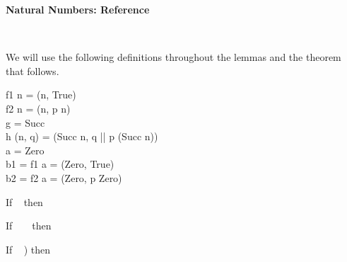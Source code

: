 \documentclass{seminar}
\begin{document}
\begin{slide}

\begin{center}
\begin{LARGE}
\textbf{Natural Numbers:  Reference}
\end{LARGE}\\[3ex]
\end{center}

We will use the following definitions throughout the lemmas and
the theorem that follows.

\begin{code}
f1 n     = (n, True)\\
f2 n     = (n, p n)\\
g        = Succ\\
h (n, q) = (Succ n, q || p (Succ n))\\
a        = Zero\\
b1       = f1 a = (Zero, True)\\
b2       = f2 a = (Zero, p Zero)
\end{code}


\newpage

\begin{lemma} \label{lemma-a}
\end{lemma}

\vspace{0.2in}

\begin{lemma} \label{lemma-b}
If ~ 
\newline
then ~ 
\end{lemma}

\vspace{0.2in}

\begin{lemma} \label{lemma-e}
\end{lemma}

\vspace{0.2in}


\begin{lemma}
\end{lemma}

\vspace{0.2in}

\begin{lemma} \label{lemma-f}
If ~  ~
then ~
\end{lemma}

\vspace{0.2in}

\begin{lemma} \label{lemma-c}
If ~  ) \tm{\wedge}
\newline
then ~ 
\end{lemma}

\end{slide}
\end{document}

